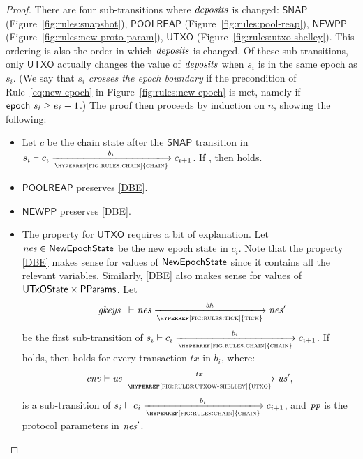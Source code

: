 \begin{proof}
  There are four sub-transitions where $\mathit{deposits}$ is changed:
  $\mathsf{SNAP}$ (Figure~\ref{fig:rules:snapshot}),
  $\mathsf{POOLREAP}$ (Figure~\ref{fig:rules:pool-reap}),
  $\mathsf{NEWPP}$ (Figure~\ref{fig:rules:new-proto-param}),
  $\mathsf{UTXO}$ (Figure~\ref{fig:rules:utxo-shelley}).
  This ordering is also the order in which $\mathit{deposits}$ is changed.
  Of these sub-transitions, only $\mathsf{UTXO}$ actually changes the value of $\mathit{deposits}$
  when $s_i$ is in the same epoch as $s_i$.
  (We say that $s_i$ \emph{crosses the epoch boundary} if the precondition of
  Rule~\ref{eq:new-epoch} in Figure~\ref{fig:rules:new-epoch} is met,
  namely if $\mathsf{epoch}~ \mathit{s_i} \ge e_\ell+1$.)
%
  The proof then proceeds by induction on $n$, showing the following:
  \begin{itemize}
    \item
      Let $c$ be the chain state after the $\mathsf{SNAP}$ transition
      in $s_i\vdash c_i\trans{\hyperref[fig:rules:chain]{chain}}{b_i}c_{i+1}$.
      If , then  holds.
    \item $\mathsf{POOLREAP}$ preserves \ref{DBE}.
    \item $\mathsf{NEWPP}$ preserves \ref{DBE}.
    \item The property for $\mathsf{UTXO}$ requires a bit of explanation.
      Let $\mathit{nes}\in\mathsf{NewEpochState}$ be the new epoch state in $c_i$.
      Note that the property \ref{DBE} makes sense for values of $\mathsf{NewEpochState}$
      since it contains all the relevant variables.
      Similarly, \ref{DBE} also makes sense for values of $\mathsf{UTxOState}\times\mathsf{PParams}$.
      Let
      $$
        {\begin{array}{c}
           \var{gkeys} \\
         \end{array}}
        \vdash\var{nes}\trans{\hyperref[fig:rules:tick]{tick}}{\var{bh}}\var{nes'}
      $$
      be the first sub-transition of
      $s_i\vdash c_i\trans{\hyperref[fig:rules:chain]{chain}}{b_i}c_{i+1}$.
      If  holds, then  holds for every transaction
      $tx$ in $b_i$, where:
      $$
      \var{env}\vdash \var{us} \trans{\hyperref[fig:rules:utxow-shelley]{utxo}}{tx} \var{us'},
      $$
      is a sub-transition of
      $s_i\vdash c_i\trans{\hyperref[fig:rules:chain]{chain}}{b_i}c_{i+1}$,
      and $\mathit{pp}$ is the protocol parameters in $\mathit{nes'}$.
  \end{itemize}


\end{proof}
